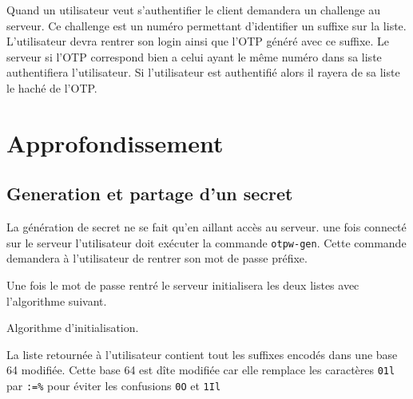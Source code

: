 \documentclass{../res/univ-projet}
\begin{document}
        Quand un utilisateur veut s'authentifier le client demandera un challenge 
    au serveur. Ce challenge est un numéro permettant d'identifier un suffixe sur
    la liste. L'utilisateur devra rentrer son login ainsi que l'OTP généré avec
    ce suffixe. Le serveur si l'OTP correspond bien a celui ayant le même numéro
    dans sa liste authentifiera l'utilisateur. Si l'utilisateur est authentifié
    alors il rayera de sa liste le haché de l'OTP.

\section{Approfondissement}
\subsection{Generation et partage d'un secret}
        La génération de secret ne se fait qu'en aillant accès au serveur. une fois
    connecté sur le serveur l'utilisateur doit exécuter la commande \verb?otpw-gen?.
    Cette commande demandera à l'utilisateur de rentrer son mot de passe préfixe.

        Une fois le mot de passe rentré le serveur initialisera les deux listes avec 
    l'algorithme suivant.
    \begin{algorithm}
        \begin{algorithmic}
            \ENDFOR
        \end{algorithmic}
        \caption{Algorithme d'initialisation.}
        \label{gen}
    \end{algorithm}
    
        La liste retournée à l'utilisateur contient tout les suffixes encodés dans une
    base 64 modifiée. Cette base 64 est dîte modifiée car elle remplace les caractères
     \verb?01l? par \verb?:=%? pour éviter les confusions \verb?0O? et \verb?1Il?
\end{document}
